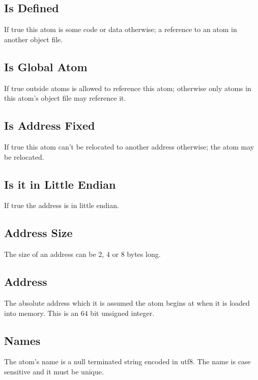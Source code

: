 \subsection{Is Defined}
If true this atom is some code or data otherwise; a reference to an atom in 
another object file.

\subsection{Is Global Atom}
If true outside atoms is allowed to reference this atom; otherwise only atoms in
this atom's object file may reference it.

\subsection{Is Address Fixed}
If true this atom can't be relocated to another address otherwise; the atom may
be relocated.

\subsection{Is it in Little Endian}
If true the address is in little endian.

\subsection{Address Size}
The size of an address can be 2, 4 or 8 bytes long.

\subsection{Address}
The absolute address which it is assumed the atom begins at when it is loaded
into memory. This is an 64 bit unsigned integer.

\subsection{Names}
The atom's name is a null terminated string encoded in utf8. The name is case 
sensitive and it must be unique.